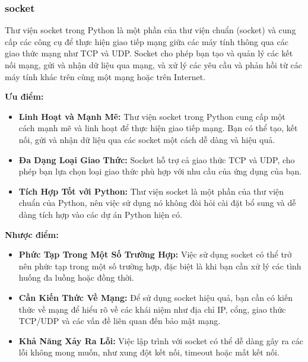\documentclass[a4paper]{article}
\begin{document}
\subsubsection{socket}
\begin{par}
Thư viện socket trong Python là một phần của thư viện chuẩn (socket) và cung cấp các công cụ để thực hiện giao tiếp mạng giữa các máy tính thông qua các giao thức mạng như TCP và UDP. Socket cho phép bạn tạo và quản lý các kết nối mạng, gửi và nhận dữ liệu qua mạng, và xử lý các yêu cầu và phản hồi từ các máy tính khác trên cùng một mạng hoặc trên Internet. 
\end{par}

\textbf{Ưu điểm: }
\begin{itemize}
    \item \textbf{Linh Hoạt và Mạnh Mẽ:} Thư viện socket trong Python cung cấp một cách mạnh mẽ và linh hoạt để thực hiện giao tiếp mạng. Bạn có thể tạo, kết nối, gửi và nhận dữ liệu qua các socket một cách dễ dàng và hiệu quả.
    
    \item \textbf{Đa Dạng Loại Giao Thức:} Socket hỗ trợ cả giao thức TCP và UDP, cho phép bạn lựa chọn loại giao thức phù hợp với nhu cầu của ứng dụng của bạn.
    
    \item \textbf{Tích Hợp Tốt với Python:} Thư viện socket là một phần của thư viện chuẩn của Python, nên việc sử dụng nó không đòi hỏi cài đặt bổ sung và dễ dàng tích hợp vào các dự án Python hiện có.
\end{itemize}

\textbf{Nhược điểm: }
\begin{itemize}
    \item \textbf{Phức Tạp Trong Một Số Trường Hợp:} Việc sử dụng socket có thể trở nên phức tạp trong một số trường hợp, đặc biệt là khi bạn cần xử lý các tình huống đa luồng hoặc đồng thời.
    
    \item \textbf{Cần Kiến Thức Về Mạng:} Để sử dụng socket hiệu quả, bạn cần có kiến thức về mạng để hiểu rõ về các khái niệm như địa chỉ IP, cổng, giao thức TCP/UDP và các vấn đề liên quan đến bảo mật mạng.
    
    \item \textbf{Khả Năng Xảy Ra Lỗi:} Việc lập trình với socket có thể dễ dàng gây ra các lỗi không mong muốn, như xung đột kết nối, timeout hoặc mất kết nối.
\end{itemize}
\end{document}
